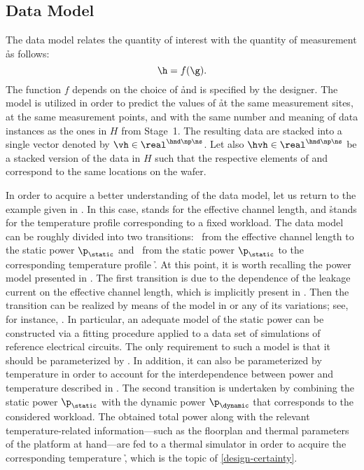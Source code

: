 \subsection{Data Model}

The data model relates the quantity of interest \g with the quantity of
measurement \h as follows:
\[
  \h = f(\g).
\]
The function $f$ depends on the choice of \h and is specified by the designer.
The model is utilized in order to predict the values of \h at the same
measurement sites, at the same measurement points, and with the same number and
meaning of data instances as the ones in $H$ from Stage~1. The resulting data
are stacked into a single vector denoted by $\vh \in \real^{\hnd \np \ns}$. Let
also $\hvh \in \real^{\hnd \np \ns}$ be a stacked version of the data in $H$
such that the respective elements of \vh and \hvh correspond to the same
locations on the wafer.

In order to acquire a better understanding of the data model, let us return to
the example given in . In this case, \g stands for the
effective channel length, and \h stands for the temperature profile
corresponding to a fixed workload. The data model can be roughly divided into
two transitions: \one~from the effective channel length \g to the static power
$\p_\static$ and \two~from the static power $\p_\static$ to the corresponding
temperature profile \h. At this point, it is worth recalling the power model
presented in . The first transition is due to the dependence
of the leakage current on the effective channel length, which is implicitly
present in . Then the transition can be realized by means of
the model in  or any of its variations; see, for instance,
\cite{chandrakasan2000, srivastava2010, juan2012}. In particular, an adequate
model of the static power can be constructed via a fitting procedure applied to
a data set of  simulations of reference electrical circuits. The only
requirement to such a model is that it should be parameterized by \g. In
addition, it can also be parameterized by temperature in order to account for
the interdependence between power and temperature described in
. The second transition is undertaken by combining the static
power $\p_\static$ with the dynamic power $\p_\dynamic$ that corresponds to the
considered workload. The obtained total power along with the relevant
temperature-related information---such as the floorplan and thermal parameters
of the platform at hand---are fed to a thermal simulator in order to acquire the
corresponding temperature \h, which is the topic of \cref{design-certainty}.

